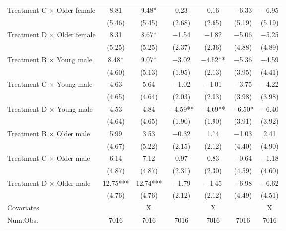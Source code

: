 \documentclass[12pt, a4paper]{article}
\begin{document}
\begin{table}[H]
\begin{threeparttable}
\begin{tabular}[t]{lcccccc}
Treatment C $\times$ Older female & \num{8.81} & \num{9.48}* & \num{0.23} & \num{0.16} & \num{-6.33} & \num{-6.95}\\
 & (\num{5.46}) & (\num{5.45}) & (\num{2.68}) & (\num{2.65}) & (\num{5.19}) & (\num{5.19})\\
Treatment D $\times$ Older female & \num{8.31} & \num{8.67}* & \num{-1.54} & \num{-1.82} & \num{-5.06} & \num{-5.25}\\
 & (\num{5.25}) & (\num{5.25}) & (\num{2.37}) & (\num{2.36}) & (\num{4.88}) & (\num{4.89})\\
Treatment B $\times$ Young male & \num{8.48}* & \num{9.07}* & \num{-3.02} & \num{-4.52}** & \num{-5.36} & \num{-4.59}\\
 & (\num{4.60}) & (\num{5.13}) & (\num{1.95}) & (\num{2.13}) & (\num{3.95}) & (\num{4.41})\\
Treatment C $\times$ Young male & \num{4.63} & \num{5.64} & \num{-1.02} & \num{-1.01} & \num{-3.75} & \num{-4.22}\\
 & (\num{4.65}) & (\num{4.64}) & (\num{2.03}) & (\num{2.03}) & (\num{3.98}) & (\num{3.98})\\
Treatment D $\times$ Young male & \num{4.53} & \num{4.84} & \num{-4.59}** & \num{-4.69}** & \num{-6.50}* & \num{-6.40}\\
 & (\num{4.64}) & (\num{4.65}) & (\num{1.90}) & (\num{1.90}) & (\num{3.91}) & (\num{3.92})\\
Treatment B $\times$ Older male & \num{5.99} & \num{3.53} & \num{-0.32} & \num{1.74} & \num{-1.03} & \num{2.41}\\
 & (\num{4.67}) & (\num{5.22}) & (\num{2.15}) & (\num{2.12}) & (\num{4.40}) & (\num{4.90})\\
Treatment C $\times$ Older male & \num{6.14} & \num{7.12} & \num{0.97} & \num{0.83} & \num{-0.64} & \num{-1.18}\\
 & (\num{4.87}) & (\num{4.87}) & (\num{2.31}) & (\num{2.30}) & (\num{4.59}) & (\num{4.60})\\
Treatment D $\times$ Older male & \num{12.75}*** & \num{12.74}*** & \num{-1.79} & \num{-1.45} & \num{-6.98} & \num{-6.62}\\
 & (\num{4.76}) & (\num{4.76}) & (\num{2.12}) & (\num{2.12}) & (\num{4.49}) & (\num{4.51})\\
\midrule
Covariates &  & X &  & X &  & X\\
Num.Obs. & \num{7016} & \num{7016} & \num{7016} & \num{7016} & \num{7016} & \num{7016}\\
\bottomrule
\end{tabular}

\end{threeparttable}
\end{table}
\end{document}
